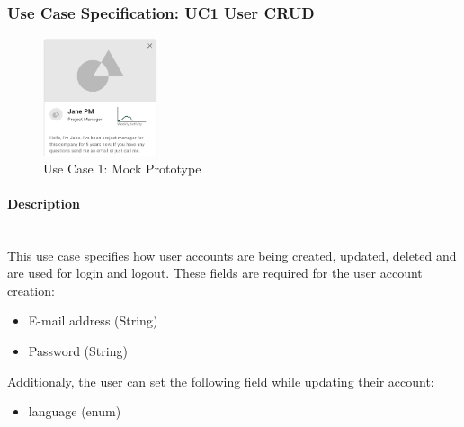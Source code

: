 
\newpage
\subsubsection{Use Case Specification: \ac{UC}1 User CRUD}
\label{sec:domainBbb}

\begin{figure}
	\includegraphics[width=0.3\textwidth]{Assets/UC_Screenshots/UC1S.png}
	\caption{Use Case 1: Mock Prototype}
	\label{fig:useCase1Detail}
\end{figure}

\paragraph*{Description}\mbox{}\\
This use case specifies how user accounts are being created, updated, deleted and are used for login and logout.
These fields are required for the user account creation:

\begin{itemize}
	\vspace{-3mm}
	\setlength\itemsep{-1em}
	\item E-mail address (String)
	\item Password (String)
\end{itemize}
Additionaly, the user can set the following field while updating their account:
\begin{itemize}
	\vspace{-3mm}
	\setlength\itemsep{-1em}
	\item language (enum)
\end{itemize}

